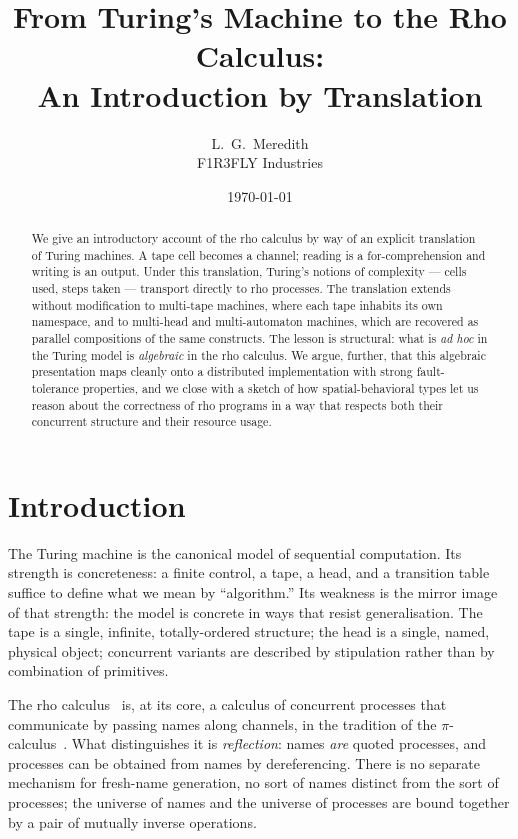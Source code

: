 \documentclass[11pt]{article}
\title{From Turing's Machine to the Rho Calculus:\\
       An Introduction by Translation}
\author{L.~G.~Meredith\\\small F1R3FLY Industries}
\date{\today}
\theoremstyle{plain}
\theoremstyle{definition}
\theoremstyle{remark}
\begin{document}
\maketitle

\begin{abstract}
We give an introductory account of the rho calculus by way of an explicit
translation of Turing machines. A tape cell becomes a channel; reading is a
for-comprehension and writing is an output. Under this translation, Turing's
notions of complexity --- cells used, steps taken --- transport directly to
rho processes. The translation extends without modification to multi-tape
machines, where each tape inhabits its own namespace, and to multi-head and
multi-automaton machines, which are recovered as parallel compositions of
the same constructs. The lesson is structural: what is \emph{ad hoc} in the
Turing model is \emph{algebraic} in the rho calculus. We argue, further, that
this algebraic presentation maps cleanly onto a distributed implementation
with strong fault-tolerance properties, and we close with a sketch of how
spatial-behavioral types let us reason about the correctness of rho programs
in a way that respects both their concurrent structure and their resource
usage.
\end{abstract}

\section{Introduction}\label{sec:intro}

The Turing machine is the canonical model of sequential computation. Its
strength is concreteness: a finite control, a tape, a head, and a transition
table suffice to define what we mean by ``algorithm.'' Its weakness is the
mirror image of that strength: the model is concrete in ways that resist
generalisation. The tape is a single, infinite, totally-ordered structure;
the head is a single, named, physical object; concurrent variants are
described by stipulation rather than by combination of primitives.

The rho calculus~\cite{MeredithRadestock} is, at its core, a calculus of
concurrent processes that communicate by passing names along channels, in
the tradition of the $\pi$-calculus~\cite{Milner92,Milner99}. What
distinguishes it is \emph{reflection}: names \emph{are} quoted processes, and
processes can be obtained from names by dereferencing. There is no separate
mechanism for fresh-name generation, no sort of names distinct from the sort
of processes; the universe of names and the universe of processes are bound
together by a pair of mutually inverse operations.
\end{document}
